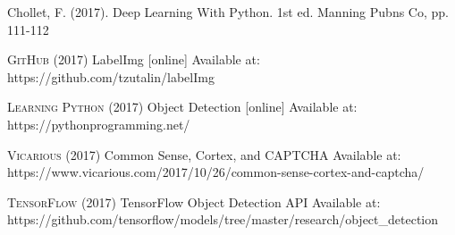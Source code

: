 \documentclass[titlepage]{article}
\begin{document}
\begin{thebibliography}{5}

Chollet, F. (2017). Deep Learning With Python. 1st ed. Manning Pubns Co, pp. 111-112

\textsc{GitHub} (2017) LabelImg [online] Available at: https://github.com/tzutalin/labelImg

\textsc{Learning Python} (2017) Object Detection [online] Available at: https://pythonprogramming.net/

\textsc{Vicarious} (2017) Common Sense, Cortex, and CAPTCHA
\newline
[online] Available at: https://www.vicarious.com/2017/10/26/common-sense-cortex-and-captcha/ 

\textsc{TensorFlow} (2017) TensorFlow Object Detection API 
\newline
[online] Available at: https://github.com/tensorflow/models/tree/master/research/object_detection


\end{thebibliography}
\end{document}
